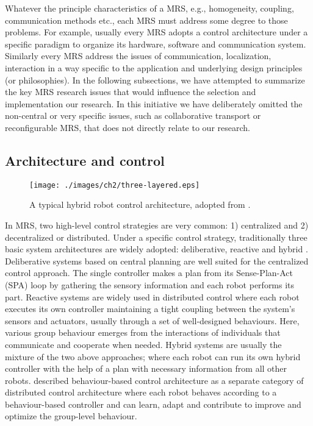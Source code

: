 Whatever the principle characteristics of a MRS, e.g., homogeneity, coupling, communication methods etc., each MRS must address some degree to those problems. For example, usually every MRS adopts a control architecture under a specific paradigm to organize its hardware, software and communication system. Similarly every MRS address the issues of communication, localization, interaction in a way specific to the application and underlying design principles (or philosophies). In the following subsections, we have attempted to summarize the key MRS research issues that would influence the selection and implementation our research. In this initiative we have deliberately omitted the non-central or very specific issues, such as collaborative transport or reconfigurable MRS, that does not directly relate to our research.
\subsection*{Architecture and control}
\label{bg:mrs:arch}
\begin{figure}
\begin{center}
\texttt{[image: ./images/ch2/three-layered.eps]} %
\caption{A typical hybrid robot control architecture, adopted from \protect{}.} 
\label{fig:three-layer-arch}
\end{center}
\end{figure}
In MRS, two high-level control strategies are very common: 1) centralized and 2) decentralized or distributed. Under a specific control strategy, traditionally three basic system architectures are widely adopted: deliberative, reactive and hybrid \cite{Mataric2007,Arkin1998}. Deliberative systems based on central planning are well suited for the centralized control approach. The single controller makes a plan from its Sense-Plan-Act (SPA) loop by gathering the sensory information and each robot performs its part. Reactive systems are widely used in distributed control where each robot executes its own controller maintaining a tight coupling between the system's sensors and actuators, usually through a set of well-designed behaviours. Here, various group behaviour emerges from the interactions of individuals that communicate and cooperate when needed. Hybrid systems are usually the mixture of the two above approaches; where each robot can run its own hybrid controller with the help of a plan with necessary information from all other robots.  described behaviour-based control architecture as a separate category of distributed control architecture where each robot behaves according to a behaviour-based controller and can learn, adapt and contribute to improve and optimize the group-level behaviour. 

